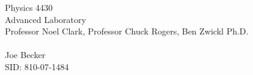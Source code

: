 \begin{titlepage}
\setlength{\topmargin}{1.5in}
\begin{center}
\Huge{Physics 4430} \\
\LARGE{Advanced Laboratory} \\
\Large{Professor Noel Clark, Professor Chuck Rogers, Ben Zwickl Ph.D.} \\[1cm]

\huge{\labname}\\[0.5cm]

\large{Joe Becker} \\
\large{SID: 810-07-1484} \\
\large{\due} 

\end{center}

\end{titlepage}

